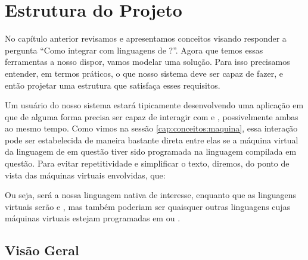 \chapter{Estrutura do Projeto}
\label{sec:estrutura}

\setcounter{defcnt}{0}

  No capítulo anterior revisamos e apresentamos conceitos visando responder a
  pergunta ``Como integrar \CXX{} com linguagens de \script{}?''. Agora que
  temos essas ferramentas a nosso dispor, vamos modelar uma solução. Para isso
  precisamos entender, em termos práticos, o que nosso sistema deve ser capaz
  de fazer, e então projetar uma estrutura que satisfaça esses requisitos.
  
  Um usuário do nosso sistema estará tipicamente desenvolvendo uma aplicação
  em \CXX{} que de alguma forma precisa ser capaz de interagir com 
  e , possivelmente ambas ao mesmo tempo. Como vimos na sessão
  \ref{cap:conceitos:maquina}, essa interação pode ser estabelecida de maneira
  bastante direta entre elas se a máquina virtual da linguagem de \script{} em
  questão tiver sido programada na linguagem compilada em questão. Para evitar
  repetitividade e simplificar o texto, diremos, do ponto de vista das
  máquinas virtuais envolvidas, que:


  Ou seja, \CXX{} será a nossa linguagem nativa de interesse, enquanto que
  as linguagens virtuais serão  e , mas também poderiam
  ser quaisquer outras linguagens cujas máquinas virtuais estejam programadas em
  \C{} ou \CXX{}.

  \section{Visão Geral}
  \label{cap:estrutura:geral}

